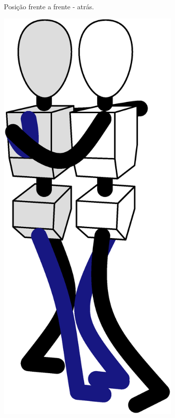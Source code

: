 \begin{figure}[!ht]
\begin{subfigure}[b]{0.2175\textwidth}
         \caption{Posição frente a frente - atrás.}
         \label{fig:positiongeralsamba:ffa}
     \end{subfigure}
     \hfill
     \begin{subfigure}[b]{0.20\textwidth}
         \centering
         \includegraphics[width=\textwidth]{chapters/cap-normas/position-fff.eps}

\end{subfigure}
\end{figure}
